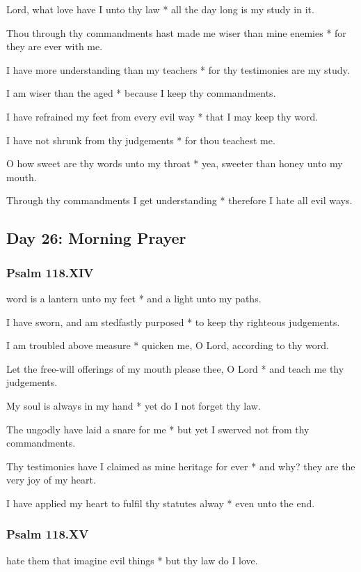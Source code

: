 Lord, what love have I unto thy law * all the day long is my study in it.

Thou through thy commandments hast made me wiser than mine enemies * for they are ever with me.

I have more understanding than my teachers * for thy testimonies are my study.

I am wiser than the aged * because I keep thy commandments.

I have refrained my feet from every evil way * that I may keep thy word.

I have not shrunk from thy judgements * for thou teachest me.

O how sweet are thy words unto my throat * yea, sweeter than honey unto my mouth.

Through thy commandments I get understanding * therefore I hate all evil ways.

\subsection{Day 26: Morning Prayer}

\subsubsection{Psalm 118.XIV}

 word is a lantern unto my feet * and a light unto my paths.

I have sworn, and am stedfastly purposed * to keep thy righteous judgements.

I am troubled above measure * quicken me, O Lord, according to thy word.

Let the free-will offerings of my mouth please thee, O Lord * and teach me thy judgements.

My soul is always in my hand * yet do I not forget thy law.

The ungodly have laid a snare for me * but yet I swerved not from thy commandments.

Thy testimonies have I claimed as mine heritage for ever * and why? they are the very joy of my heart.

I have applied my heart to fulfil thy statutes alway * even unto the end.

\subsubsection{Psalm 118.XV}

 hate them that imagine evil things * but thy law do I love.

